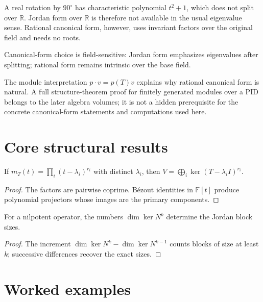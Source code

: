 \begin{example}\label{ex:i12-expand-03}
A real rotation by \(90^\circ\) has characteristic polynomial \(t^2+1\), which
does not split over \(\mathbb R\). Jordan form over \(\mathbb R\) is therefore
not available in the usual eigenvalue sense. Rational canonical form, however,
uses invariant factors over the original field and needs no roots.

Canonical-form choice is field-sensitive: Jordan form emphasizes eigenvalues
after splitting; rational form remains intrinsic over the base field.
\end{example}
\begin{remark}
The module interpretation $p\cdot v=p(T)v$ explains why rational canonical
form is natural. A full structure-theorem proof for finitely generated modules
over a PID belongs to the later algebra volumes; it is not a hidden prerequisite
for the concrete canonical-form statements and computations used here.
\end{remark}

\section{Core structural results}

\begin{theorem}\label{thm:i12-01}
If $m_T(t)=\prod_i(t-\lambda_i)^{r_i}$ with distinct $\lambda_i$, then $V=\bigoplus_i\ker(T-\lambda_iI)^{r_i}$.
\begin{proof}
The factors are pairwise coprime. Bézout identities in $\mathbb F[t]$ produce polynomial projectors whose images are the primary components.
\end{proof}
\end{theorem}

\begin{theorem}\label{thm:i12-02}
For a nilpotent operator, the numbers $\dim\ker N^k$ determine the Jordan block sizes.
\begin{proof}
The increment $\dim\ker N^k-\dim\ker N^{k-1}$ counts blocks of size at least $k$; successive differences recover the exact sizes.
\end{proof}
\end{theorem}

\section{Worked examples}

